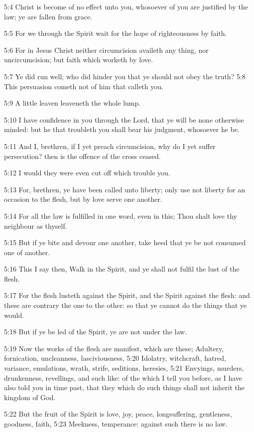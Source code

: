 5:4 Christ is become of no effect unto you, whosoever of you are
justified by the law; ye are fallen from grace.

5:5 For we through the Spirit wait for the hope of righteousness by
faith.

5:6 For in Jesus Christ neither circumcision availeth any thing, nor
uncircumcision; but faith which worketh by love.

5:7 Ye did run well; who did hinder you that ye should not obey the
truth?  5:8 This persuasion cometh not of him that calleth you.

5:9 A little leaven leaveneth the whole lump.

5:10 I have confidence in you through the Lord, that ye will be none
otherwise minded: but he that troubleth you shall bear his judgment,
whosoever he be.

5:11 And I, brethren, if I yet preach circumcision, why do I yet
suffer persecution? then is the offence of the cross ceased.

5:12 I would they were even cut off which trouble you.

5:13 For, brethren, ye have been called unto liberty; only use not
liberty for an occasion to the flesh, but by love serve one another.

5:14 For all the law is fulfilled in one word, even in this; Thou
shalt love thy neighbour as thyself.

5:15 But if ye bite and devour one another, take heed that ye be not
consumed one of another.

5:16 This I say then, Walk in the Spirit, and ye shall not fulfil the
lust of the flesh.

5:17 For the flesh lusteth against the Spirit, and the Spirit against
the flesh: and these are contrary the one to the other: so that ye
cannot do the things that ye would.

5:18 But if ye be led of the Spirit, ye are not under the law.

5:19 Now the works of the flesh are manifest, which are these;
Adultery, fornication, uncleanness, lasciviousness, 5:20 Idolatry,
witchcraft, hatred, variance, emulations, wrath, strife, seditions,
heresies, 5:21 Envyings, murders, drunkenness, revellings, and such
like: of the which I tell you before, as I have also told you in time
past, that they which do such things shall not inherit the kingdom of
God.

5:22 But the fruit of the Spirit is love, joy, peace, longsuffering,
gentleness, goodness, faith, 5:23 Meekness, temperance: against such
there is no law.

